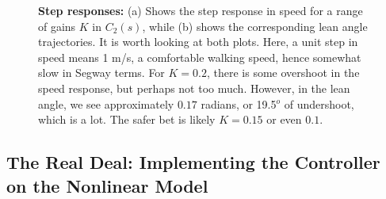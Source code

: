 \begin{figure}[htb]%
\centering
{}%
\hfill%
%
\hfill%
    \caption[]{\textbf{Step responses:} (a) Shows the step response in speed for a range of gains $K$ in $C_2(s)$, while (b) shows the corresponding lean angle trajectories. It is worth looking at both plots. Here, a unit step in speed means 1 m/s, a comfortable walking speed, hence somewhat slow in Segway terms. For $K=0.2$, there is some overshoot in the speed response, but perhaps not too much. However, in the lean angle, we see approximately $0.17$ radians, or 19.5$^o$ of undershoot, which is a lot. The safer bet is likely $K=0.15$ or even $0.1$.}
    \label{fig:SegwayStepReponsesSppedLeanAngle}
\end{figure}

\bigskip

\subsection{The Real Deal: Implementing the Controller on the Nonlinear Model}

